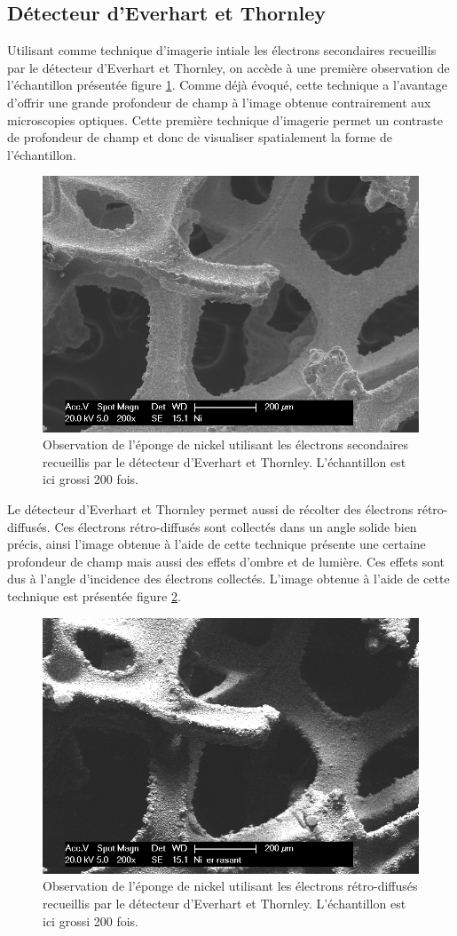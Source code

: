 \documentclass[a4paper,12pt]{article}
\newcommand\ett{Everhart et Thornley\xspace}
\begin{document}
\subsection{Détecteur d'\ett}

Utilisant comme technique d'imagerie intiale les électrons secondaires recueillis par le détecteur d'\ett,
on accède à une première observation de l'échantillon présentée figure \ref{fig:ni_es}. Comme déjà évoqué,
cette technique a l'avantage d'offrir une grande profondeur de champ à l'image obtenue contrairement aux microscopies optiques. Cette première technique d'imagerie permet un contraste de profondeur de champ et donc de visualiser spatialement la forme de l'échantillon.

\begin{figure}
\centering
\includegraphics[width = 0.7 \textwidth]{images/ni_es.png}
\caption{Observation de l'éponge de nickel utilisant les électrons secondaires recueillis par le détecteur d'\ett. L'échantillon est ici grossi 200 fois.}
\label{fig:ni_es}
\end{figure}

Le détecteur d'\ett permet aussi de récolter des électrons rétro-diffusés. Ces électrons rétro-diffusés sont
collectés dans un angle solide bien précis, ainsi l'image obtenue à l'aide de cette technique présente une
certaine profondeur de champ mais aussi des effets d'ombre et de lumière. Ces effets sont dus à l'angle
d'incidence des électrons collectés. L'image obtenue à l'aide de cette technique est présentée figure
\ref{fig:ni_er_rasant}.

\begin{figure}
\centering
\includegraphics[width = 0.7 \textwidth]{images/ni_er_rasant.png}
\caption{Observation de l'éponge de nickel utilisant les électrons rétro-diffusés recueillis par le détecteur d'\ett. L'échantillon est ici grossi 200 fois.}
\label{fig:ni_er_rasant}
\end{figure}
\end{document}
